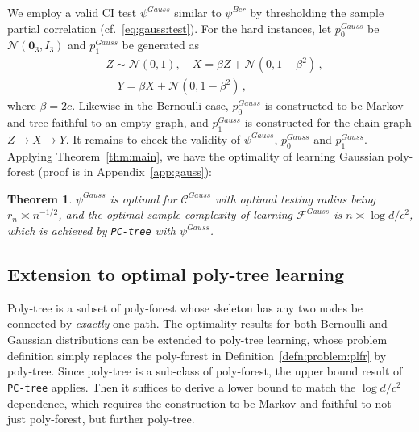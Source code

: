\documentclass{article}
\newtheorem{theorem}{Theorem}[section]
\theoremstyle{definition}
\theoremstyle{definition}
\theoremstyle{definition}
\theoremstyle{definition}
\theoremstyle{definition}
\theoremstyle{definition}
\theoremstyle{remark}
\theoremstyle{remark}
\newcommand{\dd}{d}
\newcommand{\ciclass}{\mathcal{C}}
\newcommand{\pfclass}{\mathcal{F}}
\begin{document}
We employ a valid CI test $\psi^{Gauss}$ similar to $\psi^{Ber}$ by thresholding the sample partial correlation (cf.~\eqref{eq:gauss:test}).
For the hard instances, let $p_0^{Gauss}$ be $\mathcal{N}(\mathbf{0}_3, I_3)$ and $p_1^{Gauss}$ be generated as
\begin{align*}
    & Z \sim\mathcal{N}(0,1), \quad X=\beta Z + \mathcal{N}(0,1-\beta^2)\,,\\
    & \quad Y = \beta X + \mathcal{N}(0,1-\beta^2) \,,
\end{align*}
where $\beta=2c$. 
Likewise in the Bernoulli case, $p_0^{Gauss}$ is constructed to be Markov and tree-faithful to an empty graph, and $p_1^{Gauss}$ is constructed for the chain graph $Z\to X\to Y$.
It remains to check the validity of $\psi^{Gauss}$, $p_0^{Gauss}$ and $p_1^{Gauss}$. Applying Theorem~\ref{thm:main}, we have the optimality of learning Gaussian poly-forest (proof is in Appendix~\ref{app:gauss}):
\begin{theorem}\label{thm:param:gauss}
    $\psi^{Gauss}$ is optimal for $\ciclass^{Gauss}$ with optimal testing radius being $r_n\asymp n^{-1/2}$, and the optimal sample complexity of learning $\pfclass^{Gauss}$ is $n \asymp \log\dd / c^2$, which is achieved by \texttt{PC-tree} with $\psi^{Gauss}$.
\end{theorem}




\subsection{Extension to optimal poly-tree learning}
Poly-tree is a subset of poly-forest whose skeleton has any two nodes be connected by \emph{exactly} one path.
The optimality results for both Bernoulli and Gaussian distributions can be extended to poly-tree learning, whose problem definition simply replaces the poly-forest in Definition~\ref{defn:problem:plfr} by poly-tree. 
Since poly-tree is a sub-class of poly-forest, the upper bound result of \texttt{PC-tree} applies. Then it suffices to derive a lower bound to match the $\log\dd / c^2$ dependence, which requires the construction to be Markov and faithful to not just poly-forest, but further poly-tree.
\end{document}
